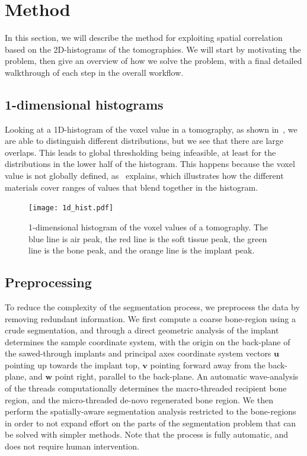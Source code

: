 \section{Method}\label{sec:method}
In this section, we will describe the method for exploiting spatial correlation based on the
2D-histograms of the tomographies. We will start by motivating the problem, then give an overview
of how we solve the problem, with a final detailed walkthrough of each step in the overall workflow.

\subsection{1-dimensional histograms}
Looking at a 1D-histogram of the voxel value in a tomography, as shown in~, we are
able to distinguish different distributions, but we see that there are large overlaps. This leads to
global thresholding being infeasible, at least for the distributions in the lower half of the histogram.
This happens because the voxel value is not globally defined, as~ explains, which
illustrates how the different materials cover ranges of values that blend together in the histogram.

\begin{figure}
    \centering
    \texttt{[image: 1d\_hist.pdf]}
    \caption{1-dimensional histogram of the voxel values of a tomography. The blue line is air peak,
    the red line is the soft tissue peak, the green line is the bone peak, and the orange line is
    the implant peak.}
    \label{fig:1d-hist}
\end{figure}

\subsection{Preprocessing}\label{sec:preprocess}
To reduce the complexity of the segmentation process, we preprocess
the data by removing redundant information.
We first compute a coarse
bone-region using a crude segmentation, and through a direct geometric
analysis of the implant determines the sample coordinate system, with the origin
on the back-plane of the sawed-through implants and principal axes coordinate system vectors
$\mathbf{u}$ pointing up towards the implant top, $\mathbf{v}$ pointing forward away from the back-plane,
and $\mathbf{w}$ point right, parallel to the back-plane. An automatic wave-analysis of the threads
computationally determines the macro-threaded recipient bone region, and the micro-threaded de-novo regenerated bone region.
We then perform the spatially-aware segmentation analysis restricted to the bone-regions in order to
not expand effort on the parts of the segmentation problem that can be solved with simpler methods.
Note that the process is fully automatic, and does not require human intervention.


